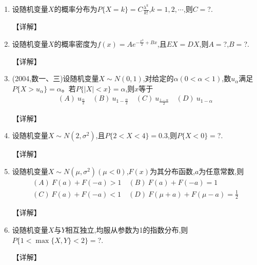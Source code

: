 \documentclass[12pt, a4paper, oneside, UTF8]{ctexbook}
\begin{document}
\begin{enumerate}[label=\arabic*.,start=6]
    \item 设随机变量$X$的概率分布为$P\{X=k\}=C\frac{\lambda^k}{k!}$,$k=1,2,\cdots$,则$C=$?.
    
    \begin{solution}
    【详解】
    \end{solution}
    
    \item 设随机变量$X$的概率密度为$f(x)=Ae^{-\frac{x^2}{2}+Bx}$,且$EX=DX$,则$A=$?,$B=$?.
    
    \begin{solution}
    【详解】
    \end{solution}
    
    \item (2004,数一、三)设随机变量$X\sim N(0,1)$,对给定的$\alpha(0<\alpha<1)$,数$u_\alpha$满足$P\{X>u_\alpha\}=\alpha$。若$P\{|X|<x\}=\alpha$,则$x$等于
    \begin{align*}
        (A)\ u_{\frac{\alpha}{2}} \quad (B)\ u_{1-\frac{\alpha}{2}} \quad (C)\ u_{\frac{1-\alpha}{2}} \quad (D)\ u_{1-\alpha}
    \end{align*}
    
    \begin{solution}
    【详解】
    \end{solution}
    
    \item 设随机变量$X\sim N(2,\sigma^2)$,且$P\{2<X<4\}=0.3$,则$P\{X<0\}=$?.
    
    \begin{solution}
    【详解】
    \end{solution}
    
    \item  设随机变量$X\sim N(\mu,\sigma^2)(\mu<0)$,$F(x)$为其分布函数,$a$为任意常数,则
    \begin{align*}
        (A)\ F(a)+F(-a)>1 \quad (B)\ F(a)+F(-a)=1 \\
        (C)\ F(a)+F(-a)<1 \quad (D)\ F(\mu+a)+F(\mu-a)=\frac{1}{2}
    \end{align*}
    
    \begin{solution}
    【详解】
    \end{solution}
    
    \item  设随机变量$X$与$Y$相互独立,均服从参数为1的指数分布,则$P\{1<\max\{X,Y\}<2\}=$?.
    
    \begin{solution}
    【详解】
    \end{solution}
    

\end{enumerate}
\end{document}
